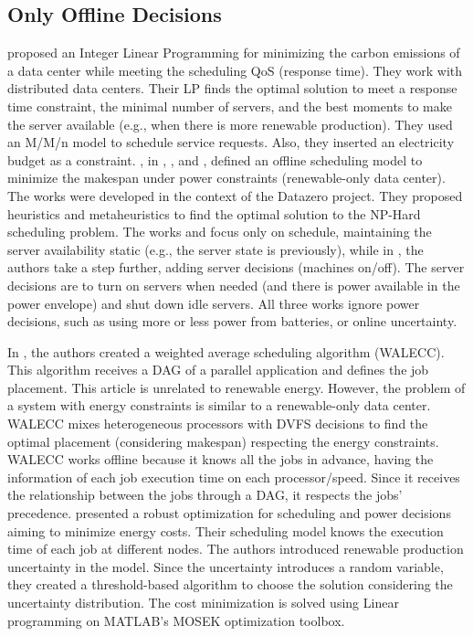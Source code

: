 \subsection{Only Offline Decisions}
\citeauthor{gu2015green} \cite{gu2015green} proposed an Integer Linear Programming for minimizing the carbon emissions of a data center while meeting the scheduling QoS (response time). They work with distributed data centers. Their LP finds the optimal solution to meet a response time constraint, the minimal number of servers, and the best moments to make the server available (e.g., when there is more renewable production). They used an M/M/n model to schedule service requests. Also, they inserted an electricity budget as a constraint. \citeauthor{kassab2017scheduling}, in \cite{kassab2017scheduling}, \cite{kassab2018assessing}, and \cite{kassab2019green}, defined an offline scheduling model to minimize the makespan under power constraints (renewable-only data center). The works were developed in the context of the Datazero project. They proposed heuristics and metaheuristics to find the optimal solution to the NP-Hard scheduling problem. The works \cite{kassab2017scheduling} and \cite{kassab2018assessing} focus only on schedule, maintaining the server availability static (e.g., the server state is previously), while in \cite{kassab2019green}, the authors take a step further, adding server decisions (machines on/off). The server decisions are to turn on servers when needed (and there is power available in the power envelope) and shut down idle servers. All three works ignore power decisions, such as using more or less power from batteries, or online uncertainty.

In \cite{hu2018schedule}, the authors created a weighted average scheduling algorithm (WALECC). This algorithm receives a DAG of a parallel application and defines the job placement. This article is unrelated to renewable energy. However, the problem of a system with energy constraints is similar to a renewable-only data center. WALECC mixes heterogeneous processors with DVFS decisions to find the optimal placement (considering makespan) respecting the energy constraints. WALECC works offline because it knows all the jobs in advance, having the information of each job execution time on each processor/speed. Since it receives the relationship between the jobs through a DAG, it respects the jobs' precedence. \citeauthor{lu2018energy} \cite{lu2018energy} presented a robust optimization for scheduling and power decisions aiming to minimize energy costs. Their scheduling model knows the execution time of each job at different nodes. The authors introduced renewable production uncertainty in the model. Since the uncertainty introduces a random variable, they created a threshold-based algorithm to choose the solution considering the uncertainty distribution. The cost minimization is solved using Linear programming on MATLAB's MOSEK optimization toolbox.

